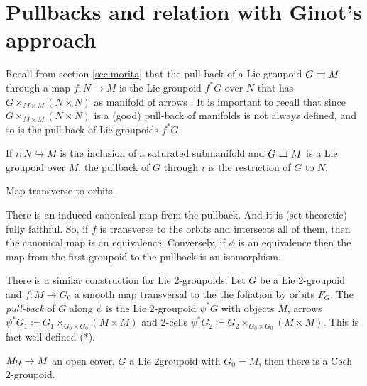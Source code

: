 %
%

\section{Pullbacks and relation with Ginot's approach}


Recall from section \ref{sec:morita} that the pull-back of a Lie groupoid $G\rightrightarrows M$ through a map $f: N\to M$ is the Lie groupoid $f^*G$ over $N$ that has $G\times_{M\times M} (N\times N)$ as manifold of arrows \cite{dh13, mm03}.
It is important to recall that since $G\times_{M\times M} (N\times N)$ is a (good) pull-back of manifolds is not always defined, and so is the pull-back of Lie groupoids $f^*G$.

\begin{example}
If $i: N\hookrightarrow M$ is the inclusion of a saturated submanifold and $G\rightrightarrows M$ is a Lie groupoid over $M$, the pullback of $G$ through $i$ is the restriction of $G$ to $N$.
\end{example}

\begin{example}
Map transverse to orbits.
\end{example}

There is an induced canonical map from the pullback. And it is (set-theoretic) fully faithful.
So, if $f$ is transverse to the orbits and intersects all of them, then the canonical map is an equivalence.
Conversely, if $\phi$ is an equivalence then the map from the first groupoid to the pullback is an isomorphism.

There is a similar construction for Lie 2-groupoids.
Let $G$ be a Lie 2-groupoid and $f: M\to G_0$ a smooth map transversal to the the foliation by orbits $F_G$.
The \emph{pull-back} of $G$ along $\psi$ is the Lie 2-groupoid $\psi^*G$ with objects $M$, arrows $\psi^*G_1 \coloneqq G_1\times_{G_0\times G_0}(M\times M)$ and 2-cells $\psi^*G_2 \coloneqq G_2\times_{G_0\times G_0}(M\times M)$. This is fact well-defined (*).


\begin{example}
$M_\mathcal U\to M$ an open cover, $G$ a Lie 2groupoid with $G_0=M$, then there is a Cech 2-groupoid.
\end{example}


